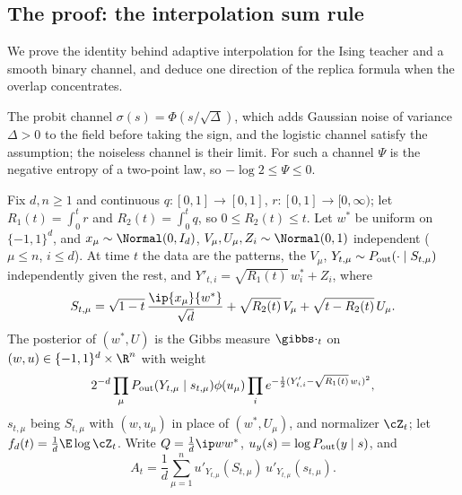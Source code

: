 \begin{refsection}
\section{The proof: the interpolation sum rule}\label{sec:glm:proof}

We prove the identity behind adaptive interpolation for the Ising teacher and a smooth binary channel, and deduce one direction of the replica formula when the overlap concentrates.


The probit channel $\sigma(s)=\Phi(s/\sqrt\Delta)$, which adds Gaussian noise of variance $\Delta>0$ to the field before taking the sign, and the logistic channel satisfy the assumption; the noiseless channel is their limit. For such a channel $\Psi$ is the negative entropy of a two-point law, so $-\log2\le\Psi\le0$.

\begin{definition}\label{def:glm:interp}
Fix $d,n\ge1$ and continuous $q\colon[0,1]\to[0,1]$, $r\colon[0,1]\to[0,\infty)$; let $R_1(t)=\int_0^tr$ and $R_2(t)=\int_0^tq$, so $0\le R_2(t)\le t$. Let $w^*$ be uniform on $\{-1,1\}^d$, and $x_\mu\sim\Normal(0,I_d)$, $V_\mu,U_\mu,Z_i\sim\Normal(0,1)$ independent ($\mu\le n$, $i\le d$). At time $t$ the data are the patterns, the $V_\mu$, $Y_{t,\mu}\sim P_{\mathrm{out}}(\cdot\mid S_{t,\mu})$ independently given the rest, and $Y'_{t,i}=\sqrt{R_1(t)}\,w^*_i+Z_i$, where
\[
S_{t,\mu}=\sqrt{1-t}\,\frac{\ip{x_\mu}{w^*}}{\sqrt d}+\sqrt{R_2(t)}\,V_\mu+\sqrt{t-R_2(t)}\,U_\mu.
\]
The posterior of $(w^*,U)$ is the Gibbs measure $\gibbs\cdot_t$ on $(w,u)\in\{-1,1\}^d\times\R^n$ with weight
\[
2^{-d}\prod_\mu P_{\mathrm{out}}(Y_{t,\mu}\mid s_{t,\mu})\phi(u_\mu)\prod_ie^{-\frac12(Y'_{t,i}-\sqrt{R_1(t)}\,w_i)^2},
\]
$s_{t,\mu}$ being $S_{t,\mu}$ with $(w,u_\mu)$ in place of $(w^*,U_\mu)$, and normalizer $\cZ_t$; let $f_d(t)=\frac1d\E\log\cZ_t$. Write $Q=\frac1d\ip w{w^*}$, $u_y(s)=\log P_{\mathrm{out}}(y\mid s)$, and
\[
A_t=\frac1d\sum_{\mu=1}^nu'_{Y_{t,\mu}}(S_{t,\mu})\,u'_{Y_{t,\mu}}(s_{t,\mu}).
\]
\end{definition}


\end{refsection}

